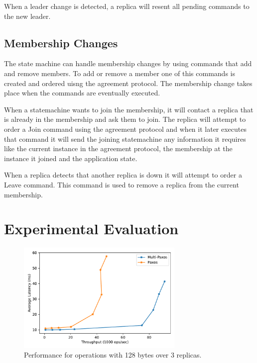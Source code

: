 \documentclass[sigconf]{acmart}
\begin{document}
When a leader change is detected, a replica will resent all pending commands to the new leader.


\subsection{Membership Changes}


The state machine can handle membership changes by using commands that add and remove members.
To add or remove a member one of this commands is created and ordered uisng the agreement protocol.
The membership change takes place when the commands are eventually executed.

When a statemachine wants to join the membership, it will contact a replica that is already in the membership and ask them to join.
The replica will attempt to order a Join command using the agreement protocol and when it later executes that command it will send
the joining statemachine any information it requires like the current instance in the agreement protocol, the membership at the instance
it joined and the application state.

When a replica detects that another replica is down it will attempt to order a Leave command.
This command is used to remove a replica from the current membership.


\section{Experimental Evaluation}

\begin{figure}[htp]
    \centering
    \includegraphics[width=8cm]{3R_128B.pdf}
    \caption{Performance for operations with 128 bytes over 3 replicas.}
    \label{fig:3replicas-128}
\end{figure}
\end{document}
